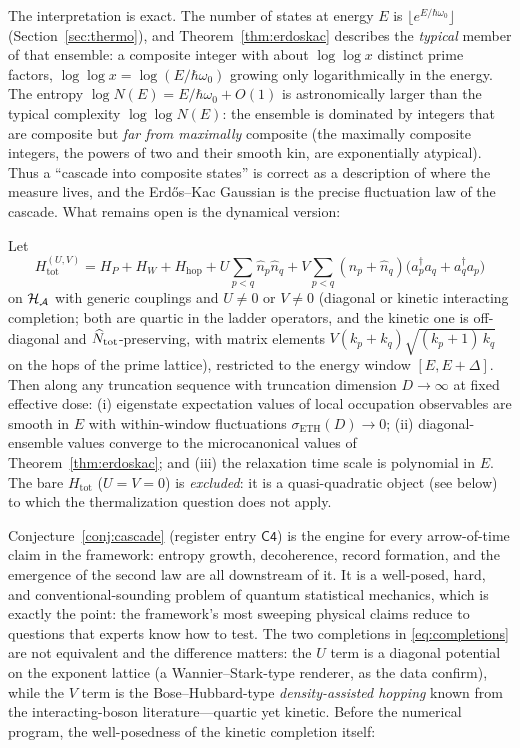The interpretation is exact. The number of states at energy $E$ is $\lfloor e^{E/\hbar\omega_{0}}\rfloor$
(Section~\ref{sec:thermo}), and Theorem~\ref{thm:erdoskac} describes the \emph{typical} member
of that ensemble: a composite integer with about $\log\log x$ distinct prime factors,
$\log\log x=\log(E/\hbar\omega_{0})$ growing only logarithmically in the energy. The entropy
$\log N(E)=E/\hbar\omega_{0}+O(1)$ is astronomically larger than the typical complexity
$\log\log N(E)$: the ensemble is dominated by integers that are composite but \emph{far from
maximally} composite (the maximally composite integers, the powers of two and their smooth
kin, are exponentially atypical). Thus a ``cascade into composite states'' is
correct as a description of where the measure lives, and the Erd\H{o}s--Kac Gaussian is the
precise fluctuation law of the cascade. What remains open is the dynamical version:

\begin{conjecture}\label{conj:cascade}
Let
\begin{equation}\label{eq:completions}
H_{\mathrm{tot}}^{(U,V)}=H_{P}+H_{W}+H_{\mathrm{hop}}
+U\!\sum_{p<q}\hat n_{p}\hat n_{q}
+V\!\sum_{p<q}(\hat n_{p}+\hat n_{q})\bigl(a_{p}^{\dagger}a_{q}+a_{q}^{\dagger}a_{p}\bigr)
\end{equation}
on $\mathcal{H}_{\mathcal{A}}$ with generic couplings and $U\neq0$ or $V\neq0$ (diagonal or kinetic
interacting completion; both are quartic in the ladder operators, and the kinetic one is
off-diagonal and $\widehat{N}_{\mathrm{tot}}$-preserving, with matrix elements
$V(k_{p}+k_{q})\sqrt{(k_{p}+1)\,k_{q}}$ on the hops of the prime lattice), restricted to the
energy window $[E,E+\Delta]$. Then along any truncation
sequence with truncation dimension $D\to\infty$ at fixed effective dose: (i) eigenstate expectation values of local
occupation observables are smooth in $E$ with within-window fluctuations
$\sigma_{\mathrm{ETH}}(D)\to0$; (ii) diagonal-ensemble values converge to the microcanonical
values of Theorem~\ref{thm:erdoskac}; and (iii) the relaxation time scale is polynomial in
$E$. The bare $H_{\mathrm{tot}}$ ($U=V=0$) is \emph{excluded}: it is a quasi-quadratic object
(see below) to which the thermalization question does not apply.
\end{conjecture}

Conjecture~\ref{conj:cascade} (register entry $\mathsf{C4}$) is the engine for every
arrow-of-time claim in the framework: entropy growth, decoherence, record formation, and the
emergence of the second law are all downstream of it. It is a well-posed, hard, and
conventional-sounding problem of quantum statistical mechanics, which is exactly the point:
the framework's most sweeping physical claims reduce to questions that experts know how to
test. The two completions in \eqref{eq:completions} are not equivalent and the
difference matters: the $U$ term is a diagonal potential on the exponent lattice (a
Wannier--Stark-type renderer, as the data confirm), while the $V$ term is the
Bose--Hubbard-type \emph{density-assisted hopping} known from the interacting-boson
literature---quartic yet kinetic. Before the numerical program, the well-posedness of the
kinetic completion itself:

